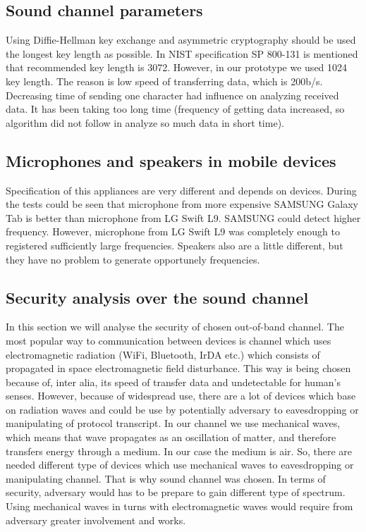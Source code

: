 \documentclass[11pt,titlepage]{article}
\theoremstyle{plain}
\begin{document}
\subsection{Sound channel parameters}

Using Diffie-Hellman key exchange and asymmetric cryptography should be used the longest key length as possible. In NIST specification SP 800-131 is mentioned that recommended key length is 3072. However, in our prototype we used 1024 key length. The reason is low speed of transferring data, which is 200b/s. Decreasing time of sending one character had influence on analyzing received data. It has been taking too long time (frequency of getting data increased, so algorithm did not follow in analyze so much data in short time).


\subsection{Microphones and speakers in mobile devices}
Specification of this appliances are very different and depends on devices. During the tests could be seen that microphone from more expensive SAMSUNG Galaxy Tab is better than microphone from LG Swift L9. SAMSUNG could detect higher frequency. However, microphone from LG Swift L9 was completely enough to registered sufficiently large frequencies. Speakers also are a little different, but they have no problem to generate opportunely frequencies.

\subsection{Security analysis over the sound channel}
In this section we will analyse the security of chosen out-of-band channel. The most popular way to communication between devices is channel which uses electromagnetic radiation (WiFi, Bluetooth, IrDA etc.) which consists of propagated in space electromagnetic field disturbance. This way is being chosen because of, inter alia, its speed of transfer data and undetectable for human's senses. However, because of widespread use, there are a lot of devices which base on radiation waves and could be use by potentially adversary to eavesdropping or manipulating of protocol transcript. In our channel we use mechanical waves, which means that wave propagates as an oscillation of matter, and therefore transfers energy through a medium. In our case the medium is air. So, there are needed different type of devices which use mechanical waves to eavesdropping or manipulating channel. That is why sound channel was chosen. In terms of security, adversary would has to be prepare to gain different type of spectrum. Using mechanical waves in turns with electromagnetic waves would require from adversary greater involvement and works.
\end{document}
